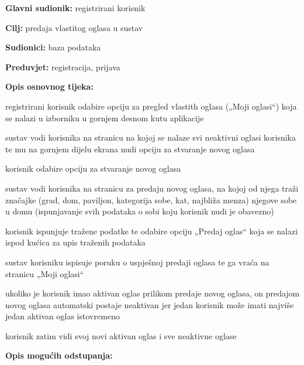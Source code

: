 \noindent {}
\begin{packed_item}
	
	\item \textbf{Glavni sudionik: } registrirani korisnik
	\item  \textbf{Cilj:} predaja vlastitog oglasa u sustav
	\item  \textbf{Sudionici:} baza podataka
	\item  \textbf{Preduvjet:} registracija, prijava
	\item  \textbf{Opis osnovnog tijeka:}
	
	\item[] \begin{packed_enum}
		
		\item registrirani korisnik odabire opciju za pregled vlastith oglasa („Moji oglasi“) koja se nalazi u izborniku u gornjem desnom kutu aplikacije 
		\item sustav vodi korisnika na stranicu na kojoj se nalaze svi neaktivni oglasi korisnika te mu na gornjem dijelu ekrana nudi opciju za stvaranje novog oglasa
		\item korisnik odabire opciju za stvaranje novog oglasa
		\item sustav vodi korisnika na stranicu za predaju novog oglasa, na kojoj od njega traži značajke (grad, dom, paviljon, kategorija sobe, kat, najbliža menza) njegove sobe u domu (ispunjavanje svih podataka o sobi koju korisnik nudi je obavezno)
		\item korisnik ispunjuje tražene podatke te odabire opciju „Predaj oglas“ koja se nalazi ispod kućica za upis traženih podataka
		\item sustav korisniku ispisuje poruku o uspješnoj predaji oglasa te ga vraća na stranicu „Moji oglasi“
		\item ukoliko je korisnik imao aktivan oglas prilikom predaje novog oglasa, on predajom novog oglasa automatski postaje neaktivan jer jedan korisnik može imati najviše jedan aktivan oglas istovremeno
		\item korisnik zatim vidi svoj novi aktivan oglas i sve neaktivne oglase
		
	\end{packed_enum}


\item  \textbf{Opis mogućih odstupanja:}

\item[] \begin{packed_item}
	

\end{packed_item}
\end{packed_item}
